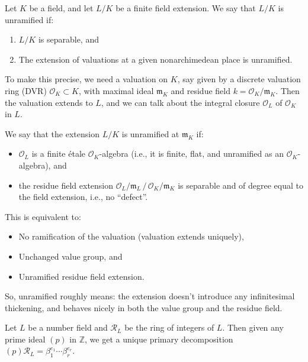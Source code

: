 \documentclass[12pt]{article}
\begin{document}
\begin{definition}
Let $K$ be a field, and let $L/K$ be a finite field extension.
We say that $L/K$ is unramified if:
\begin{enumerate}
    \item $L/K$ is separable, and
    \item The extension of valuations at a given nonarchimedean place is unramified.
\end{enumerate}
\end{definition}



To make this precise, we need a valuation on $K$, say given by a discrete valuation ring (DVR) $\mathcal{O}_K \subset K$, with maximal ideal $\mathfrak{m}_K$ and residue field $k = \mathcal{O}_K/\mathfrak{m}_K$.
Then the valuation extends to $L$, and we can talk about the integral closure $\mathcal{O}_L$ of $\mathcal{O}_K$ in $L$.

\begin{definition}
We say that the extension $L/K$ is unramified at $\mathfrak{m}_K$ if:
\begin{itemize}
    \item $\mathcal{O}_L$ is a finite étale $\mathcal{O}_K$-algebra (i.e., it is finite, flat, and unramified as an $\mathcal{O}_K$-algebra), and
    \item the residue field extension $\mathcal{O}_L/\mathfrak{m}_L \, / \, \mathcal{O}_K/\mathfrak{m}_K$ is separable and of degree equal to the field extension, i.e., no ``defect''.
\end{itemize}
\end{definition}

This is equivalent to:
\begin{itemize}
    \item No ramification of the valuation (valuation extends uniquely),
    \item Unchanged value group, and
    \item Unramified residue field extension.
\end{itemize}

So, unramified roughly means: the extension doesn't introduce any infinitesimal thickening, and behaves nicely in both the value group and the residue field.



Let $L$ be a number field and $\mathcal{R}_L$ be the ring of integers of $L$. Then given
any prime ideal $(p)$ in $\mathbb{Z}$, we get a unique primary decomposition $(p)\mathcal{R}_L =
\beta_1^{e_1} \cdots \beta_r^{e_r}$.
\end{document}
